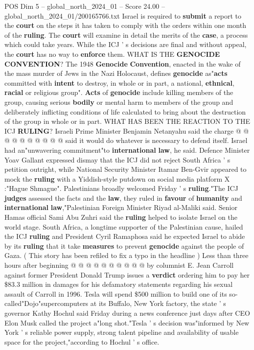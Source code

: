 \begin{textsample}{POS Dim 5 – global\_north\_2024\_01 – Score 24.00 – global\_north\_2024\_01/200165766.txt}
Israel is required to \textbf{submit} a report to the \textbf{court} on the steps it has taken to comply with the orders within one month of the \textbf{ruling}.
The \textbf{court} will examine in detail the merits of the \textbf{case}, a process which could take years.
While the ICJ ' s decisions are final and without appeal, the \textbf{court} has no way to \textbf{enforce} them.
WHAT IS THE \textbf{GENOCIDE} \textbf{CONVENTION}?
The 1948 \textbf{Genocide} \textbf{Convention}, enacted in the wake of the mass murder of Jews in the Nazi Holocaust, defines \textbf{genocide} as"\textbf{acts} committed with \textbf{intent} to destroy, in whole or in part, a national, \textbf{ethnical}, \textbf{racial} or religious group". \textbf{Acts} of \textbf{genocide} include killing members of the group, causing serious \textbf{bodily} or mental harm to members of the group and deliberately inflicting conditions of life calculated to bring about the destruction of the group in whole or in part.
WHAT HAS BEEN THE REACTION TO THE ICJ \textbf{RULING}?
Israeli Prime Minister Benjamin Netanyahu said the charge @ @ @ @ @ @ @ @ @ @ said it would do whatever is necessary to defend itself.
Israel had an"unwavering commitment"to \textbf{international} \textbf{law}, he said.
Defence Minister Yoav Gallant expressed dismay that the ICJ did not reject South Africa ' s petition outright, while National Security Minister Itamar Ben-Gvir appeared to mock the \textbf{ruling} with a Yiddish-style putdown on social media platform X :"Hague Shmague".
Palestinians broadly welcomed Friday ' s \textbf{ruling}."The ICJ \textbf{judges} assessed the facts and the \textbf{law}, they ruled in \textbf{favour} of \textbf{humanity} and \textbf{international} \textbf{law},"Palestinian Foreign Minister Riyad al-Maliki said.
Senior Hamas official Sami Abu Zuhri said the \textbf{ruling} helped to isolate Israel on the world stage.
South Africa, a longtime supporter of the Palestinian cause, hailed the ICJ \textbf{ruling} and President Cyril Ramaphosa said he expected Israel to abide by its \textbf{ruling} that it take \textbf{measures} to prevent \textbf{genocide} against the people of Gaza. ( This story has been refiled to fix a typo in the headline ) Less than three hours after beginning @ @ @ @ @ @ @ @ @ @ by columnist E.
Jean Carroll against former President Donald Trump issues a \textbf{verdict} ordering him to pay her \$83.3 million in damages for his defamatory statements regarding his sexual assault of Carroll in 1996.
Tesla will spend \$500 million to build one of its so-called"Dojo"supercomputers at its Buffalo, New York factory, the state ' s governor Kathy Hochul said Friday during a news conference just days after CEO Elon Musk called the project a"long shot."Tesla ' s decision was"informed by New York ' s reliable power supply, strong talent pipeline and availability of usable space for the project,"according to Hochul ' s office.

\end{textsample}
